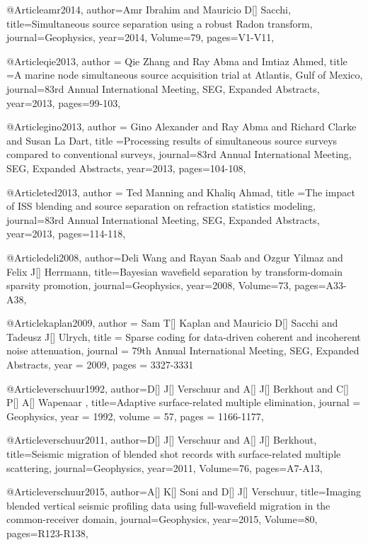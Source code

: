 {%
@Article{amr2014,
  author={Amr Ibrahim and Mauricio D[] Sacchi},
  title={Simultaneous source separation using a robust Radon transform},
  journal={Geophysics},
  year=2014,
  Volume=79,
  pages={V1-V11},
}

@Article{qie2013,
  author = {Qie Zhang and Ray Abma and Imtiaz Ahmed},
  title ={A marine node simultaneous source acquisition trial at Atlantis, Gulf of Mexico},
  journal={83rd Annual International Meeting, SEG, Expanded Abstracts},
  year=2013,
  pages={99-103},
}

@Article{gino2013,
  author = {Gino Alexander and Ray Abma and Richard Clarke and Susan La Dart},
  title ={Processing results of simultaneous source surveys compared to conventional surveys},
  journal={83rd Annual International Meeting, SEG, Expanded Abstracts},
  year=2013,
  pages={104-108},
}

@Article{ted2013,
  author = {Ted Manning and Khaliq Ahmad},
  title ={The impact of ISS blending and source separation on refraction statistics modeling},
  journal={83rd Annual International Meeting, SEG, Expanded Abstracts},
  year=2013,
  pages={114-118},
}

@Article{deli2008,
  author={Deli Wang and Rayan Saab and Ozgur Yilmaz and Felix J[] Herrmann},
  title={Bayesian wavefield separation by transform-domain sparsity promotion},
  journal={Geophysics},
  year=2008,
  Volume=73,
  pages={A33-A38},
}


@Article{kaplan2009,
  author = 	 {Sam T[] Kaplan and Mauricio D[] Sacchi and Tadeusz J[] Ulrych},
  title = 	 {Sparse coding for data-driven coherent and incoherent noise attenuation},
  journal = 	 {79th Annual International Meeting, SEG, Expanded Abstracts},
  year = 	 2009,
  pages =	 {3327-3331}
}



@Article{verschuur1992,
  author={D[] J[] Verschuur and A[] J[] Berkhout and C[] P[] A[] Wapenaar },
  title={Adaptive surface-related multiple elimination},
  journal = 	 {Geophysics},
  year = 	 1992,
  volume =	 57,
  pages =	 {1166-1177},
}

@Article{verschuur2011,
  author={D[] J[] Verschuur and A[] J[] Berkhout},
  title={Seismic migration of blended shot records with surface-related multiple scattering},
  journal={Geophysics},
  year=2011,
  Volume=76,
  pages={A7-A13},
}

@Article{verschuur2015,
  author={A[] K[] Soni and D[] J[] Verschuur},
  title={Imaging blended vertical seismic profiling data using full-wavefield migration in the common-receiver domain},
  journal={Geophysics},
  year=2015,
  Volume=80,
  pages={R123-R138},
}


}
